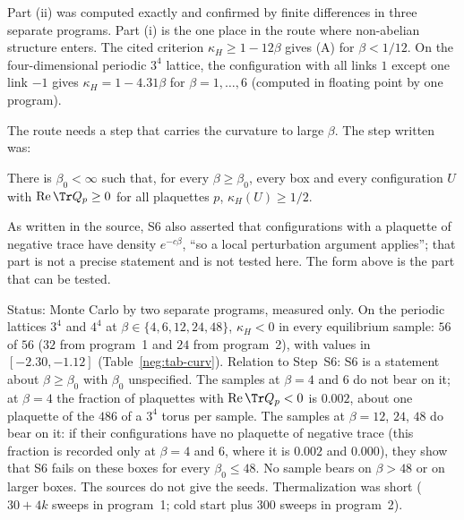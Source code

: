 Part (ii) was computed exactly and confirmed by finite differences in three separate programs. Part (i) is the one place in the route where
non-abelian structure enters. The cited criterion $\kappa_H\ge1-12\beta$ \cite[(4.2), (4.8),
Thm.~1.4]{SZZ23} gives (A) for $\beta<1/12$. On the four-dimensional periodic $3^4$ lattice,
the configuration with all links $1$ except one link $-1$ gives $\kappa_H=1-4.31\beta$ for
$\beta=1,\dots,6$ (computed in floating point by one program).

The route needs a step that carries the curvature to large $\beta$. The step written was:

\begin{hypothesis}[Step S6]\label{neg:hyp-S6}
There is $\beta_0<\infty$ such that, for every $\beta\ge\beta_0$, every box and every configuration
$U$ with $\operatorname{Re}\Tr Q_p\ge0$ for all plaquettes $p$, $\kappa_H(U)\ge 1/2$.
\end{hypothesis}

As written in the source, S6 also asserted that configurations with a plaquette of negative trace
have density $e^{-c\beta}$, ``so a local perturbation argument applies''; that part is not a
precise statement and is not tested here. The form above is the part that can be tested.

\begin{observation}\label{neg:obs-curv}
Status: Monte Carlo by two separate programs, measured only. On the periodic lattices $3^4$ and
$4^4$ at $\beta\in\{4,6,12,24,48\}$, $\kappa_H<0$ in every equilibrium sample: $56$ of $56$
($32$ from program~1 and $24$ from program~2), with values in $[-2.30,-1.12]$
(Table~\ref{neg:tab-curv}). Relation to Step~S6: S6 is a statement about $\beta\ge\beta_0$ with
$\beta_0$ unspecified. The samples at $\beta=4$ and $6$ do not bear on it; at $\beta=4$ the
fraction of plaquettes with $\operatorname{Re}\Tr Q_p<0$ is $0.002$, about one plaquette of the
$486$ of a $3^4$ torus per sample. The samples at $\beta=12$, $24$, $48$ do bear on it: if their
configurations have no plaquette of negative trace (this fraction is recorded only at $\beta=4$
and $6$, where it is $0.002$ and $0.000$), they show that S6 fails on these boxes for every
$\beta_0\le48$. No sample bears on $\beta>48$ or on larger boxes. The sources do not give the
seeds. Thermalization was short ($30+4k$ sweeps in program~1; cold start plus $300$ sweeps in
program~2).
\end{observation}

